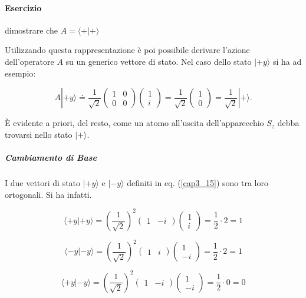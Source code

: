 \documentclass[a4paper,12pt,oneside]{book}
\begin{document}
\paragraph{Esercizio}
dimostrare  che $A= \langle + | + \rangle $

Utilizzando questa rappresentazione è poi possibile derivare l'azione dell'operatore $A$ su un generico vettore di stato. Nel caso dello stato $| +y \rangle $ si ha ad esempio:

\begin{equation}
A | +y \rangle \doteq \frac{1}{\sqrt{2}}
\begin{pmatrix}
1 & 0\\
0 & 0
\end{pmatrix}
\begin{pmatrix}
1\\
i
\end{pmatrix}=
\frac{1}{\sqrt{2}}\begin{pmatrix}
1\\
0
\end{pmatrix}=
\frac{1}{\sqrt{2}}| + \rangle .
\end{equation}

È evidente a priori, del resto, come un atomo all'uscita dell'apparecchio $S_z$ debba trovarsi nello stato $| + \rangle $.

\subparagraph{Cambiamento di Base}
I due vettori di stato $| +y \rangle $ e $| -y \rangle$ definiti in eq. (\ref{cap3_15}) sono tra loro ortogonali. Si ha infatti.

\begin{equation}
\langle +y | +y \rangle=\left(\frac{1}{\sqrt{2}}\right)^2
\begin{pmatrix}
1 & -i
\end{pmatrix}
\begin{pmatrix}
1 \\
i
\end{pmatrix}=
\frac{1}{2}\cdot 2= 1
\end{equation}

\begin{equation}
\langle -y | -y \rangle =\left(\frac{1}{\sqrt{2}}\right)^2
\begin{pmatrix}
1 & i
\end{pmatrix}
\begin{pmatrix}
1 \\
-i
\end{pmatrix}=
\frac{1}{2}\cdot 2= 1
\end{equation}

\begin{equation}
\langle +y | -y \rangle =\left(\frac{1}{\sqrt{2}}\right)^2
\begin{pmatrix}
1 & -i
\end{pmatrix}
\begin{pmatrix}
1 \\
-i
\end{pmatrix}=
\frac{1}{2}\cdot 0= 0
\end{equation}
\end{document}
